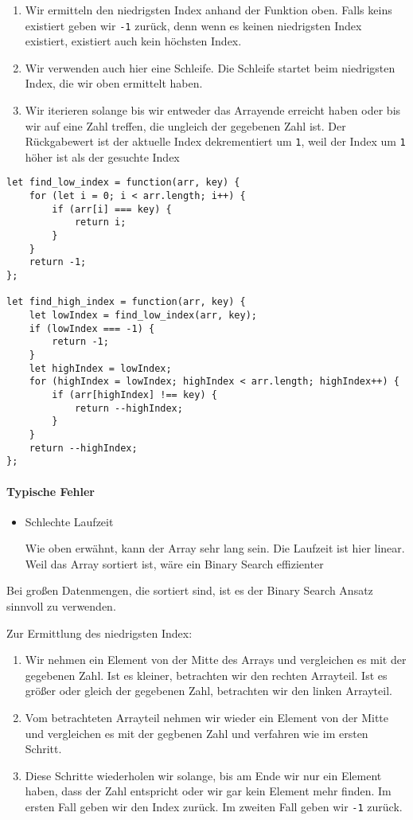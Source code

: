 \documentclass[babel]{book}
\begin{document}
\begin{enumerate} 
	\item Wir ermitteln den niedrigsten Index anhand der Funktion oben. Falls keins existiert geben wir \lstinline|-1| zurück, denn wenn es keinen niedrigsten Index existiert, existiert auch kein höchsten Index. 
	\item Wir verwenden auch hier eine Schleife. Die Schleife startet beim niedrigsten Index, die wir oben ermittelt haben. 
	\item Wir iterieren solange bis wir entweder das Arrayende erreicht haben oder bis wir auf eine Zahl treffen, die ungleich der gegebenen Zahl ist. Der Rückgabewert ist der aktuelle Index dekrementiert um \lstinline|1|, weil der Index um \lstinline|1| höher ist als der gesuchte Index
\end{enumerate}

\begin{lstlisting}[caption=My Javascript Example]
let find_low_index = function(arr, key) {
	for (let i = 0; i < arr.length; i++) {
		if (arr[i] === key) {
			return i;
		}
	}
	return -1;
};

let find_high_index = function(arr, key) {
	let lowIndex = find_low_index(arr, key);
	if (lowIndex === -1) {
		return -1;
	}
	let highIndex = lowIndex;
	for (highIndex = lowIndex; highIndex < arr.length; highIndex++) {
		if (arr[highIndex] !== key) {
			return --highIndex;
		}
	}
	return --highIndex;
};
\end{lstlisting}

\paragraph{Typische Fehler}
\begin{itemize} 
	\item Schlechte Laufzeit
	
	Wie oben erwähnt, kann der Array sehr lang sein. Die Laufzeit ist hier linear. Weil das Array sortiert ist, wäre ein Binary Search effizienter
	
\end{itemize}

Bei großen Datenmengen, die sortiert sind, ist es der Binary Search Ansatz sinnvoll zu verwenden.

Zur Ermittlung des niedrigsten Index:
\begin{enumerate}
	\item Wir nehmen ein Element von der Mitte des Arrays und vergleichen es mit der gegebenen Zahl. Ist es kleiner, betrachten wir den rechten Arrayteil. Ist es größer oder gleich der gegebenen Zahl, betrachten wir den linken Arrayteil.
	\item Vom betrachteten Arrayteil nehmen wir wieder ein Element von der Mitte und vergleichen es mit der gegbenen Zahl und verfahren wie im ersten Schritt.
	\item Diese Schritte wiederholen wir solange, bis am Ende wir nur ein Element haben, dass der Zahl entspricht oder wir gar kein Element mehr finden. Im ersten Fall geben wir den Index zurück. Im zweiten Fall geben wir \lstinline|-1| zurück.
\end{enumerate}
\end{document}
